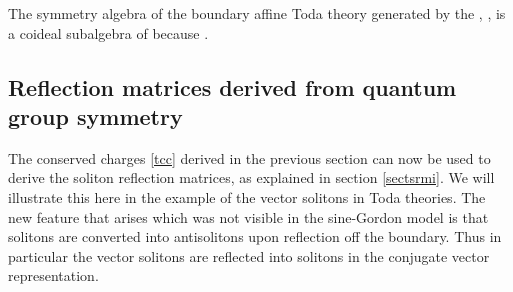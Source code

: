 \documentclass[a4paper,12pt]{article}
\providecommand{\uqgh}{U_q(\hat{g})}
\numberwithin{equation}{section}
\begin{document}
The symmetry algebra of the boundary affine Toda theory generated
by the \coordHE{}, \coordHE{}, is a coideal subalgebra of
\myHighlight{$\uqgh$}\coordHE{} because \coordHE{}.



\subsection{Reflection matrices derived from quantum group
symmetry\label{sectrm}}

The conserved charges \eqref{tcc} derived in the previous section
can now be used to derive the soliton reflection matrices, as
explained in section \ref{sectsrmi}. We will illustrate this here
in the example of the vector solitons in \coordHE{} Toda
theories. The new feature that arises which was not visible in the
sine-Gordon model is that solitons are converted into antisolitons
upon reflection off the boundary. Thus in particular the vector
solitons are reflected into solitons in the conjugate vector
representation.
\end{document}
